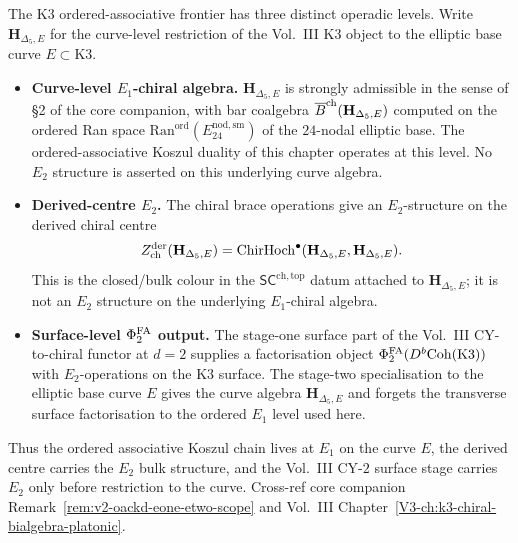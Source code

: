 \begin{remark}
\label{rem:oackdf-native-derived}
The K3 ordered-associative frontier has three distinct operadic
levels. Write $\mathbf H_{\Delta_5,E}$ for the curve-level restriction
of the Vol.~III K3 object to the elliptic base curve
$E\subset\mathrm{K3}$.

\begin{itemize}
\item \textbf{Curve-level $E_1$-chiral algebra.} $\mathbf H_{\Delta_5,E}$ is
 strongly admissible in the sense of \S2 of the core companion, with
 bar coalgebra $\overline{B}^{\mathrm{ch}}(\mathbf H_{\Delta_5,E})$ computed on the ordered
 Ran space $\mathrm{Ran}^{\mathrm{ord}}(E^{\mathrm{nod,sm}}_{24})$ of
 the $24$-nodal elliptic base. The ordered-associative Koszul duality
 of this chapter operates at this level. No $E_2$ structure is asserted
 on this underlying curve algebra.
\item \textbf{Derived-centre $E_2$.} The chiral brace operations give
 an $E_2$-structure on the derived chiral centre
 \[
  Z^{\mathrm{der}}_{\mathrm{ch}}(\mathbf H_{\Delta_5,E})
  =
  \mathrm{ChirHoch}^\bullet(\mathbf H_{\Delta_5,E},
  \mathbf H_{\Delta_5,E}).
 \]
 This is the closed/bulk colour in the
 $\mathsf{SC}^{\mathrm{ch,top}}$ datum attached to
 $\mathbf H_{\Delta_5,E}$; it is not an $E_2$ structure on the
 underlying $E_1$-chiral algebra.
\item \textbf{Surface-level $\Phi^{\mathrm{FA}}_2$ output.} The stage-one surface
 part of the Vol.~III CY-to-chiral functor at $d = 2$ supplies a
 factorisation object
 $\Phi^{\mathrm{FA}}_2(D^b\mathrm{Coh}(\mathrm{K3}))$ with $E_2$-operations on the
 K3 surface. The stage-two specialisation to the elliptic base curve
 $E$ gives the curve algebra
 $\mathbf H_{\Delta_5,E}$ and forgets the transverse surface
 factorisation to the ordered $E_1$ level used here.
\end{itemize}

Thus the ordered associative Koszul chain lives at $E_1$ on the curve
$E$, the derived centre carries the $E_2$ bulk structure, and the
Vol.~III CY-$2$ surface stage carries $E_2$ only before restriction to the
curve. Cross-ref core companion
Remark~\ref{rem:v2-oackd-eone-etwo-scope} and
Vol.~III Chapter~\ref{V3-ch:k3-chiral-bialgebra-platonic}.
\end{remark}

